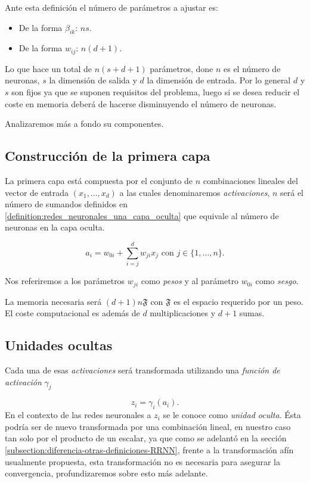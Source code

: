 Ante esta definición el número de parámetros a ajustar es: 
\begin{itemize}
    \item De la forma $\beta_{i k}$: $n s$. 
    \item De la forma $w_{i j}$: $n(d+1)$.
\end{itemize}
Lo que hace un total de $n(s+d+1)$ parámetros, done $n$ es el número de neuronas, $s$ la dimensión de salida y $d$ la dimensión de entrada. Por lo general $d$ y $s$ son fijos ya que se suponen requisitos del problema, luego si se desea reducir el coste en memoria deberá de hacerse disminuyendo el número de neuronas.

Analizaremos más a fondo su componentes. 

\subsection*{Construcción de la primera capa}
La primera capa está compuesta por el conjunto de $n$ combinaciones
lineales del vector de entrada $(x_1, \ldots, x_d)$
a las cuales denominaremos \textit{activaciones}, $n$ será el número de sumandos definidos en \ref{definition:redes_neuronales_una_capa_oculta}  que equivale al número de neuronas en la capa oculta. 

\begin{equation}
    a_i = w_{0 i} + \sum_{i=j}^d w_{j i} x_j 
    \text{ con } j \in \{1, \ldots, n \}.
\end{equation}

Nos referiremos a los  parámetros $w_{j i}$ como 
\textit{pesos} y al parámetro $w_{0 i}$ como 
\textit{sesgo}.  

La memoria necesaria será $(d+1)n \mathfrak{F}$ 
con $\mathfrak{F}$ es el espacio requerido por un peso. 
El coste computacional es además de $d$ multiplicaciones 
y $d+1$ sumas.

\subsection*{Unidades ocultas}
Cada una de esas \textit{activaciones} será transformada
utilizando una \textit{función de activación} $\gamma_j$ 

\begin{equation}
    z_i = \gamma_i(a_i).
\end{equation}
En el contexto de las redes neuronales a $z_i$ se le conoce como \textit{unidad oculta}. Ésta  podría ser de 
nuevo  transformada por una combinación lineal, en nuestro caso tan solo 
por el producto de un escalar, ya que como se adelantó en la sección \ref{subsection:diferencia-otras-definiciones-RRNN},
 frente a la transformación afín usualmente propuesta, esta transformación no es necesaria para asegurar la convergencia, profundizaremos sobre esto más adelante. 


